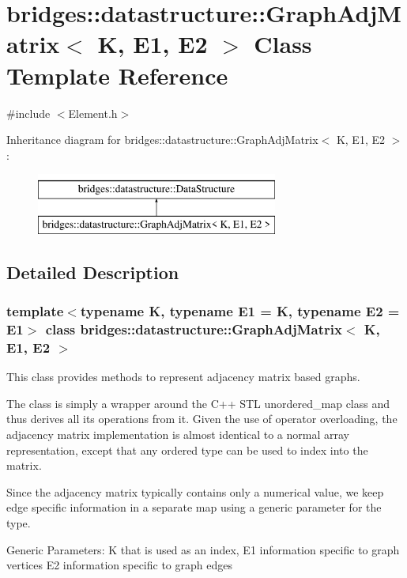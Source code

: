 \hypertarget{classbridges_1_1datastructure_1_1_graph_adj_matrix}{}\section{bridges\+::datastructure\+::Graph\+Adj\+Matrix$<$ K, E1, E2 $>$ Class Template Reference}
\label{classbridges_1_1datastructure_1_1_graph_adj_matrix}


{\ttfamily \#include $<$Element.\+h$>$}

Inheritance diagram for bridges\+::datastructure\+::Graph\+Adj\+Matrix$<$ K, E1, E2 $>$\+:\begin{figure}[H]
\begin{center}
\leavevmode
\includegraphics[height=2.000000cm]{classbridges_1_1datastructure_1_1_graph_adj_matrix}
\end{center}
\end{figure}


\subsection{Detailed Description}
\subsubsection*{template$<$typename K, typename E1 = K, typename E2 = E1$>$\newline
class bridges\+::datastructure\+::\+Graph\+Adj\+Matrix$<$ K, E1, E2 $>$}

This class provides methods to represent adjacency matrix based graphs. 

The class is simply a wrapper around the C++ S\+TL unordered\+\_\+map class and thus derives all its operations from it. Given the use of operator overloading, the adjacency matrix implementation is almost identical to a normal array representation, except that any ordered type can be used to index into the matrix.

Since the adjacency matrix typically contains only a numerical value, we keep edge specific information in a separate map using a generic parameter for the type.

Generic Parameters\+: K that is used as an index, E1 information specific to graph vertices E2 information specific to graph edges


